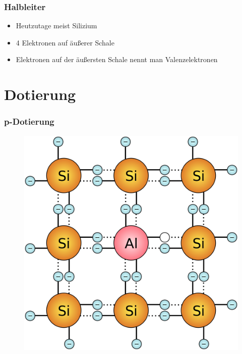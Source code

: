 \begin{frame}
    \frametitle{Halbleiter}
    \begin{center}
    \begin{itemize}
			\item Heutzutage meist Silizium
			\item 4 Elektronen auf äußerer Schale
			\item Elektronen auf der äußersten Schale nennt man Valenzelektronen
    \end{itemize}
	\end{center}
\end{frame}

\section*{Dotierung}

\begin{frame}
    \frametitle{p-Dotierung}

	 \begin{figure}
         \includegraphics[width=\textwidth,height=.7\textheight,keepaspectratio]{e12/p-dot.png}       
    	 \end{figure}
\end{frame}

